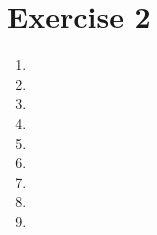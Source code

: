 \documentclass[leqno]{article}
\begin{document}
\section{Exercise 2}

\begin{enumerate}

    \item
    \item
    \item
    \item
    \item
    \item
    \item
    \item
    \item

\end{enumerate}
\end{document}
